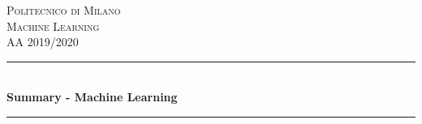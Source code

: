 \documentclass[12pt]{article}
\begin{document}
\begin{titlepage}

    \newcommand{\HRule}{\rule{\linewidth}{0.5mm}} %



    \center %


    \textsc{\LARGE Politecnico di Milano}\\[1.5cm] %
    \textsc{\Large Machine Learning}\\[0.5cm] %
    \textsc{\large AA 2019/2020}\\[0.5cm] %


    \HRule \\[0.4cm]
    { \huge \bfseries Summary - Machine Learning}\\[0.4cm] %
    \HRule \\[1.5cm]





\end{titlepage}
\end{document}
